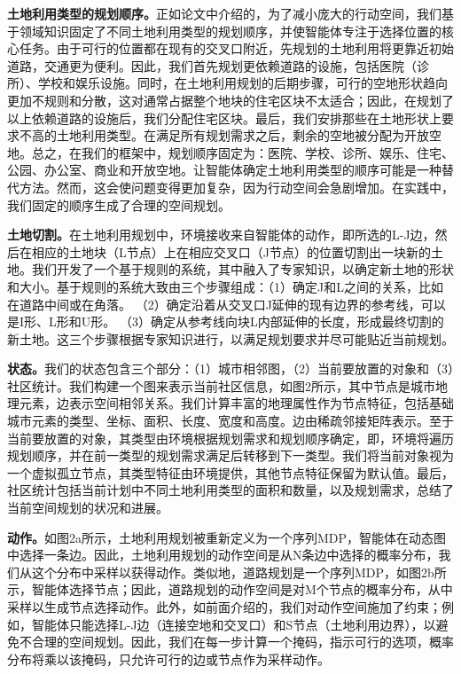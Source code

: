 \textbf{土地利用类型的规划顺序。}正如论文中介绍的，为了减小庞大的行动空间，我们基于领域知识固定了不同土地利用类型的规划顺序，并使智能体专注于选择位置的核心任务。由于可行的位置都在现有的交叉口附近，先规划的土地利用将更靠近初始道路，交通更为便利。因此，我们首先规划更依赖道路的设施，包括医院（诊所）、学校和娱乐设施。同时，在土地利用规划的后期步骤，可行的空地形状趋向更加不规则和分散，这对通常占据整个地块的住宅区块不太适合；因此，在规划了以上依赖道路的设施后，我们分配住宅区块。最后，我们安排那些在土地形状上要求不高的土地利用类型。在满足所有规划需求之后，剩余的空地被分配为开放空地。总之，在我们的框架中，规划顺序固定为：医院、学校、诊所、娱乐、住宅、公园、办公室、商业和开放空地。让智能体确定土地利用类型的顺序可能是一种替代方法。然而，这会使问题变得更加复杂，因为行动空间会急剧增加。在实践中，我们固定的顺序生成了合理的空间规划。

\textbf{土地切割。}在土地利用规划中，环境接收来自智能体的动作，即所选的L-J边，然后在相应的土地块（L节点）上在相应交叉口（J节点）的位置切割出一块新的土地。我们开发了一个基于规则的系统，其中融入了专家知识，以确定新土地的形状和大小。基于规则的系统大致由三个步骤组成：（1）确定J和L之间的关系，比如在道路中间或在角落。 （2）确定沿着从交叉口J延伸的现有边界的参考线，可以是I形、L形和U形。 （3）确定从参考线向块L内部延伸的长度，形成最终切割的新土地。这三个步骤根据专家知识进行，以满足规划要求并尽可能贴近当前规划。

\textbf{状态。}我们的状态包含三个部分：（1）城市相邻图，（2）当前要放置的对象和（3）社区统计。我们构建一个图来表示当前社区信息，如图2所示，其中节点是城市地理元素，边表示空间相邻关系。我们计算丰富的地理属性作为节点特征，包括基础城市元素的类型、坐标、面积、长度、宽度和高度。边由稀疏邻接矩阵表示。至于当前要放置的对象，其类型由环境根据规划需求和规划顺序确定，即，环境将遍历规划顺序，并在前一类型的规划需求满足后转移到下一类型。我们将当前对象视为一个虚拟孤立节点，其类型特征由环境提供，其他节点特征保留为默认值。最后，社区统计包括当前计划中不同土地利用类型的面积和数量，以及规划需求，总结了当前空间规划的状况和进展。

\textbf{动作。}如图2a所示，土地利用规划被重新定义为一个序列MDP，智能体在动态图中选择一条边。因此，土地利用规划的动作空间是从N条边中选择的概率分布，我们从这个分布中采样以获得动作。类似地，道路规划是一个序列MDP，如图2b所示，智能体选择节点；因此，道路规划的动作空间是对M个节点的概率分布，从中采样以生成节点选择动作。此外，如前面介绍的，我们对动作空间施加了约束；例如，智能体只能选择L-J边（连接空地和交叉口）和S节点（土地利用边界），以避免不合理的空间规划。因此，我们在每一步计算一个掩码，指示可行的选项，概率分布将乘以该掩码，只允许可行的边或节点作为采样动作。

